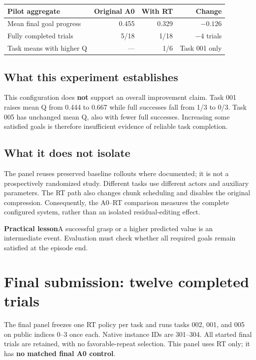 \documentclass[11pt]{article}
\newcommand{\note}[2]{\begin{tcolorbox}[colback=pale,colframe=pale,boxrule=0pt,arc=1.5mm,left=3mm,right=3mm,top=2mm,bottom=2mm]\textbf{\color{ink}#1}\quad #2\end{tcolorbox}}
\begin{document}
\par\vspace{2pt}
\begin{tabularx}{\linewidth}{@{}Xrrr@{}}\toprule
\textbf{Pilot aggregate} & \textbf{Original A0} & \textbf{With RT} & \textbf{Change}\\\midrule
Mean final goal progress & 0.455 & 0.329 & $-0.126$\\
Fully completed trials & 5/18 & 1/18 & $-4$ trials\\
Task means with higher Q & --- & 1/6 & Task 001 only\\
\bottomrule\end{tabularx}\par\vspace{2pt}

\subsection{What this experiment establishes}
This configuration does \textbf{not} support an overall improvement claim. Task 001 raises mean Q from 0.444 to 0.667 while full successes fall from 1/3 to 0/3. Task 005 has unchanged mean Q, also with fewer full successes. Increasing some satisfied goals is therefore insufficient evidence of reliable task completion.

\subsection{What it does not isolate}
The panel reuses preserved baseline rollouts where documented; it is not a prospectively randomized study. Different tasks use different actors and auxiliary parameters. The RT path also changes chunk scheduling and disables the original compression. Consequently, the A0--RT comparison measures the complete configured system, rather than an isolated residual-editing effect.

\note{Practical lesson}{A successful grasp or a higher predicted value is an intermediate event. Evaluation must check whether all required goals remain satisfied at the episode end.}

\newpage
\section{Final submission: twelve completed trials}
The final panel freezes one RT policy per task and runs tasks 002, 001, and 005 on public indices 0--3 once each. Native instance IDs are 301--304. All started final trials are retained, with no favorable-repeat selection. This panel uses RT only; it has \textbf{no matched final A0 control}.
\end{document}

